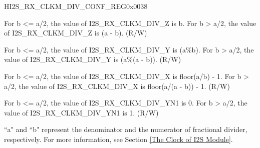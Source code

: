 \begin{register}{H}{I2S\_RX\_CLKM\_DIV\_CONF\_REG}{0x{}0038}\label{regdesc:I2SRXCLKMDIVCONFREG}
%
%
%
%
%
\regnewline%
\begin{regdesc}\begin{reglist}
\label{fielddesc:I2SRXCLKMDIVZ}\item [I2S\_RX\_CLKM\_DIV\_Z] For b <= a/2, the value of I2S\_RX\_CLKM\_DIV\_Z is b. For b > a/2, the value of I2S\_RX\_CLKM\_DIV\_Z is (a - b). (R/W)
\label{fielddesc:I2SRXCLKMDIVY}\item [I2S\_RX\_CLKM\_DIV\_Y] For b <= a/2, the value of I2S\_RX\_CLKM\_DIV\_Y is (a\%b). For b > a/2, the value of I2S\_RX\_CLKM\_DIV\_Y is (a\%(a - b)). (R/W)
\label{fielddesc:I2SRXCLKMDIVX}\item [I2S\_RX\_CLKM\_DIV\_X] For b <= a/2, the value of I2S\_RX\_CLKM\_DIV\_X is floor(a/b) - 1. For b > a/2, the value of I2S\_RX\_CLKM\_DIV\_X is floor(a/(a - b)) - 1. (R/W)
\label{fielddesc:I2SRXCLKMDIVYN1}\item [I2S\_RX\_CLKM\_DIV\_YN1] For b <= a/2, the value of I2S\_RX\_CLKM\_DIV\_YN1 is 0. For b > a/2, the value of I2S\_RX\_CLKM\_DIV\_YN1 is 1. (R/W)
\end{reglist}\end{regdesc}
\vspace{-2em}
\begin{tiplisting}
``a" and ``b" represent the denominator and the numerator of fractional divider, respectively. For more information, see Section \ref{The Clock of I2S Module}.
\end{tiplisting}
\end{register}


